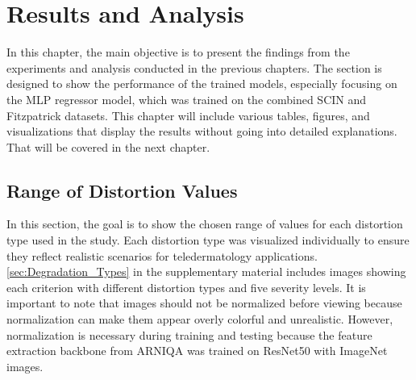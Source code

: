 \chapter{Results and Analysis}
\label{ch:ResultsAnalysis}
In this chapter, the main objective is to present the findings from the experiments and analysis conducted in the previous chapters. The section is designed to show the performance of the trained models, especially focusing on the MLP regressor model, which was trained on the combined SCIN and Fitzpatrick datasets. This chapter will include various tables, figures, and visualizations that display the results without going into detailed explanations. That will be covered in the next chapter. \par

\section{Range of Distortion Values}
\label{sec:RangeDistortionValues}
In this section, the goal is to show the chosen range of values for each distortion type used in the study. Each distortion type was visualized individually to ensure they reflect realistic scenarios for teledermatology applications. \autoref{sec:Degradation_Types} in the supplementary material includes images showing each criterion with different distortion types and five severity levels. It is important to note that images should not be normalized before viewing because normalization can make them appear overly colorful and unrealistic. However, normalization is necessary during training and testing because the feature extraction backbone from ARNIQA\autocite{ARNIQA} was trained on ResNet50 with ImageNet images. \par
\clearpage
